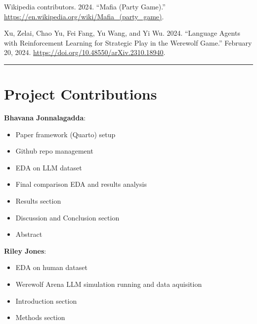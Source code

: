 \documentclass[
  letterpaper,
  DIV=11,
  numbers=noendperiod,
  oneside]{scrreprt}
\newlength{\cslhangindent}
\newenvironment{CSLReferences}[2] %
 {\begin{list}{}{%
  \setlength{\itemindent}{0pt}
  \setlength{\leftmargin}{0pt}
  \setlength{\parsep}{0pt}
  \ifodd #1
   \setlength{\leftmargin}{\cslhangindent}
   \setlength{\itemindent}{-1\cslhangindent}
  \fi
  \setlength{\itemsep}{#2\baselineskip}}}
 {\end{list}}
\providecommand{\tightlist}{%
  \setlength{\itemsep}{0pt}\setlength{\parskip}{0pt}}
\begin{document}
\begin{CSLReferences}{1}{0}
Wikipedia contributors. 2024. {``Mafia (Party Game).''}
\url{https://en.wikipedia.org/wiki/Mafia_(party_game)}.

Xu, Zelai, Chao Yu, Fei Fang, Yu Wang, and Yi Wu. 2024. {``Language
{Agents} with {Reinforcement Learning} for {Strategic Play} in the
{Werewolf Game}.''} February 20, 2024.
\url{https://doi.org/10.48550/arXiv.2310.18940}.

\end{CSLReferences}

\begin{center}\rule{0.5\linewidth}{0.5pt}\end{center}

\chapter{Project Contributions}\label{project-contributions}

\textbf{Bhavana Jonnalagadda}:

\begin{itemize}
\tightlist
\item
  Paper framework (Quarto) setup
\item
  Github repo management
\item
  EDA on LLM dataset
\item
  Final comparison EDA and results analysis
\item
  Results section
\item
  Discussion and Conclusion section
\item
  Abstract
\end{itemize}

\textbf{Riley Jones}:

\begin{itemize}
\tightlist
\item
  EDA on human dataset
\item
  Werewolf Arena LLM simulation running and data aquisition
\item
  Introduction section
\item
  Methods section
\end{itemize}
\end{document}

